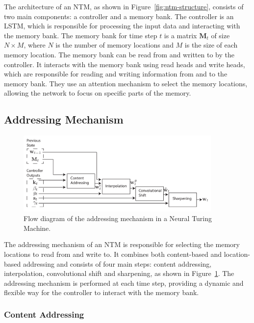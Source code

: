 \documentclass{article}
\newcommand{\reffig}[1]{Figure~\ref{#1}}
\begin{document}
The architecture of an NTM, as shown in \reffig{fig:ntm-structure}, consists of two main
components: a controller and a memory bank. The controller is an LSTM, which is
responsible for processing the input data and interacting with the memory bank. The memory
bank for time step $t$ is a matrix $\textbf{M}_t$ of size $N \times M$, where $N$ is the
number of memory locations and $M$ is the size of each memory location. The memory bank
can be read from and written to by the controller. It interacts with the memory bank using
read heads and write heads, which are responsible for reading and writing information from
and to the memory bank. They use an attention mechanism to select the memory locations,
allowing the network to focus on specific parts of the memory.


\subsection{Addressing Mechanism}
\label{sec:4.1}

\begin{figure}[htbp]
  \centering
  \includegraphics[width=0.9\textwidth]{ntm_addr_4.png}
  \caption{Flow diagram of the addressing mechanism in a Neural Turing Machine.
    \cite{gravesNeuralTuringMachines2014}}
  \label{fig:ntm-addressing}
\end{figure}

The addressing mechanism of an NTM is responsible for selecting the memory locations to
read from and write to. It combines both content-based and location-based addressing and
consists of four main steps: content addressing, interpolation, convolutional shift and
sharpening, as shown in \reffig{fig:ntm-addressing}. The addressing mechanism is performed
at each time step, providing a dynamic and flexible way for the controller to interact
with the memory bank.


\subsubsection{Content Addressing}
\label{sec:4.1.0}
\end{document}
